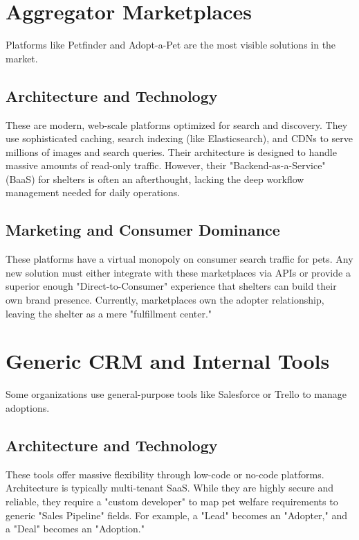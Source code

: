 \section{Aggregator Marketplaces}

Platforms like Petfinder and Adopt-a-Pet are the most visible solutions in the market.

\subsection{Architecture and Technology}
These are modern, web-scale platforms optimized for search and discovery. They use sophisticated caching, search indexing (like Elasticsearch), and CDNs to serve millions of images and search queries. Their architecture is designed to handle massive amounts of read-only traffic. However, their "Backend-as-a-Service" (BaaS) for shelters is often an afterthought, lacking the deep workflow management needed for daily operations.

\subsection{Marketing and Consumer Dominance}
These platforms have a virtual monopoly on consumer search traffic for pets. Any new solution must either integrate with these marketplaces via APIs or provide a superior enough "Direct-to-Consumer" experience that shelters can build their own brand presence. Currently, marketplaces own the adopter relationship, leaving the shelter as a mere "fulfillment center."

\section{Generic CRM and Internal Tools}

Some organizations use general-purpose tools like Salesforce or Trello to manage adoptions.

\subsection{Architecture and Technology}
These tools offer massive flexibility through low-code or no-code platforms. Architecture is typically multi-tenant SaaS. While they are highly secure and reliable, they require a "custom developer" to map pet welfare requirements to generic "Sales Pipeline" fields. For example, a "Lead" becomes an "Adopter," and a "Deal" becomes an "Adoption." 

